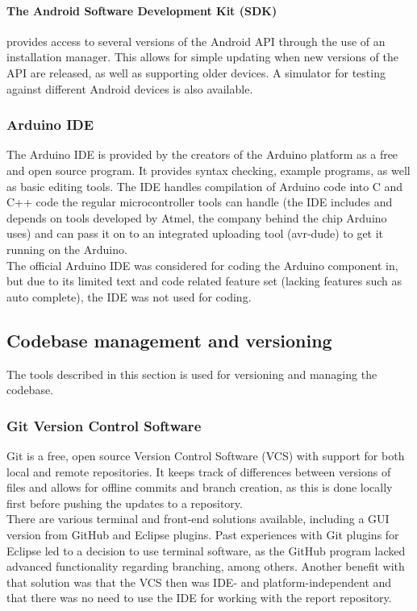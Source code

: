 \paragraph{The Android Software Development Kit (SDK)}
provides access to several versions of the Android API through the use of an installation manager. This allows for simple updating when new versions of the API are released, as well as supporting older devices. A simulator for testing against different Android devices is also available.

\subsubsection{Arduino IDE}
The Arduino IDE is provided by the creators of the Arduino platform as a free and open source program. It provides syntax checking, example programs, as well as basic editing tools. The IDE handles compilation of Arduino code into C and C++ code the regular microcontroller tools can handle (the IDE includes and depends on tools developed by Atmel, the company behind the chip Arduino uses) and can pass it on to an integrated uploading tool (avr-dude) to get it running on the Arduino.\\
\newline
The official Arduino IDE was considered for coding the Arduino component in, but due to its limited text and code related feature set (lacking features such as auto complete), the IDE was not used for coding.

\subsection{Codebase management and versioning}
The tools described in this section is used for versioning and managing the codebase. 

\subsubsection{Git Version Control Software}
Git is a free, open source Version Control Software (VCS) with support for both local and remote repositories. It keeps track of differences between versions of files and allows for offline commits and branch creation, as this is done locally first before pushing the updates to a repository.\\
\newline
There are various terminal and front-end solutions available, including a GUI version from GitHub and Eclipse plugins. Past experiences with Git plugins for Eclipse led to a decision to use terminal software, as the GitHub program lacked advanced functionality regarding branching, among others. Another benefit with that solution was that the VCS then was IDE- and platform-independent and that there was no need to use the IDE for working with the report repository.


